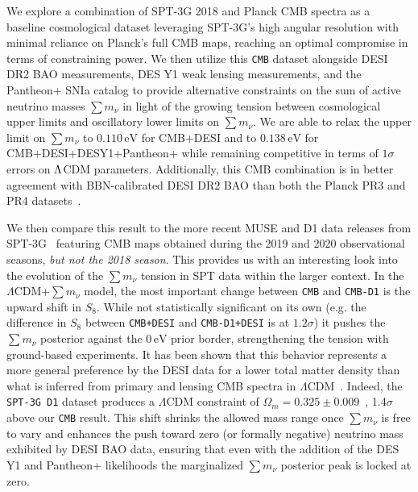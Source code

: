 \documentclass[12pt,a4paper]{article}
\newcommand{\eV}{\,\text{eV}}
\renewcommand\O{\Omega}
\newcommand\s{\sigma}
\renewcommand\L{\Lambda}
\newcommand\?{/\hspace{0pt}}
\def\Mnu{\sum m_\nu}
\begin{document}
We explore a combination of SPT-3G 2018 and Planck CMB spectra as a baseline cosmological dataset leveraging SPT-3G's high angular resolution with minimal reliance on Planck's full CMB maps, reaching an optimal compromise in terms of constraining power. We then utilize this \texttt{CMB} dataset alongside DESI DR2 BAO measurements, DES Y1 weak lensing measurements, and the Pantheon+ SNIa catalog to provide alternative constraints on the sum of active neutrino masses $\Mnu$ in light of the growing tension between cosmological upper limits and oscillatory lower limits on $\Mnu$. We are able to relax the upper limit on $\Mnu$ to $0.110\eV$ for CMB+DESI and to $0.138 \eV$ for CMB+DESI+DESY1+Pantheon+ while remaining competitive in terms of $1\sigma$ errors on $\rm \Lambda$CDM parameters. Additionally, this CMB combination is in better agreement with BBN-calibrated DESI DR2 BAO than both the Planck PR3 and PR4 datasets~\cite{DESI:2025zgx,Allali:2024aiv}.

We then compare this result to the more recent MUSE and D1 data releases from SPT-3G~\cite{SPT-3G:2025bzu} featuring CMB maps obtained during the 2019 and 2020 observational seasons, \emph{but not the 2018 season}. This provides us with an interesting look into the evolution of the $\Mnu$ tension in SPT data within the larger context. In the $\Lambda$CDM+$\Mnu$ model, the most important change between \texttt{CMB} and \texttt{CMB-D1} is the upward shift in $S_8$. While not statistically significant on its own (e.g. the difference in $S_8$ between \texttt{CMB+DESI} and \texttt{CMB-D1+DESI} is at $1.2\sigma$) it pushes the $\Mnu$ posterior against the $0\eV$ prior border, strengthening the tension with ground-based experiments. It has been shown that this behavior represents a more general preference by the DESI data for a lower total matter density than what is inferred from primary and lensing CMB spectra in $\L$CDM~\cite{Cozzumbo:2025ewt,Green:2024xbb,Naredo-Tuero:2024sgf}. Indeed, the \texttt{SPT-3G D1} dataset produces a $\L$CDM constraint of $\O_m = 0.325\pm 0.009$~\cite{SPT-3G:2025bzu}, 1.4$\s$ above our \texttt{CMB} result. This shift shrinks the allowed mass range once $\Mnu$ is free to vary and enhances the push toward zero (or formally negative) neutrino mass exhibited by DESI BAO data, ensuring that even with the addition of the DES Y1 and Pantheon+ likelihoods the marginalized $\Mnu$ posterior peak is locked at zero.
\end{document}
